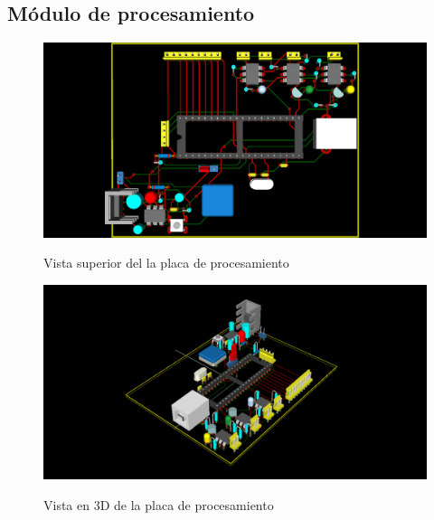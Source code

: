 \newpage
\subsection{M\'odulo de procesamiento}
\begin{figure}[htp]
  \centering
  \includegraphics[width=14cm]{./img/pic_board_3d_1.png}
  \label{fig:pic_board_3d_1}
  \caption{Vista superior del la placa de procesamiento}
\end{figure}

\begin{figure}[htp]
  \centering
  \includegraphics[width=14cm]{./img/pic_board_3d_2.png}
  \label{fig:pic_board_3d_2}
  \caption{Vista en 3D de la placa de procesamiento}
\end{figure}

